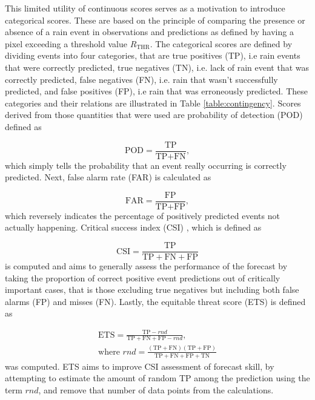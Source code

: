 This limited utility of continuous scores serves as a motivation to introduce categorical scores. These are based on the principle of comparing the presence or absence of a rain event in observations and predictions as defined by having a pixel exceeding a threshold value $R_{\text{THR}}$. The categorical scores are defined by dividing events into four categories, that are true positives (TP), i.e rain events that were correctly predicted, true negatives (TN), i.e. lack of rain event that was correctly predicted, false negatives (FN), i.e. rain that wasn't successfully predicted, and false positives (FP), i.e rain that was erroneously predicted. These categories and their relations are illustrated in Table \ref{table:contingency}. Scores derived from those quantities that were used are probability of detection (POD) \cite{schaefer_critical_1990} defined as

\begin{equation}
	\text{POD} = \frac{\text{TP}}{\text{TP}+\text{FN}},
\end{equation} 
%
which simply tells the probability that an event really occurring is correctly predicted. Next, false alarm rate (FAR) \cite{schaefer_critical_1990} is calculated as 

\begin{equation}
	\text{FAR} = \frac{\text{FP}}{\text{TP}+\text{FP}},
\end{equation}
%
which reversely indicates the percentage of positively predicted events not actually happening. Critical success index (CSI) \cite{schaefer_critical_1990}, which is defined as 

\begin{equation}
	\text{CSI} = \frac{\text{TP}}{\text{TP}+\text{FN}+\text{FP}}
\end{equation}
%
is computed and aims to generally assess the performance of the forecast by taking the proportion of correct positive event predictions out of critically important cases, that is those excluding true negatives but including both false alarms (FP) and misses (FN). Lastly, the equitable threat score (ETS) \cite{hogan_equitability_2010} is defined as  

\begin{equation}
\begin{split}
\text{ETS} = \frac{\text{TP} - rnd}{\text{TP}+\text{FN}+\text{FP} - rnd}, \\
\text{where } rnd = \frac{(\text{TP}+\text{FN})(\text{TP}+\text{FP})}{\text{TP}+\text{FN}+\text{FP}+\text{TN}}
\end{split}
\end{equation}
%
was computed. ETS aims to improve CSI assessment of forecast skill, by attempting to estimate the amount of random TP among the prediction using the term $rnd$, and remove that number of data points from the calculations.

